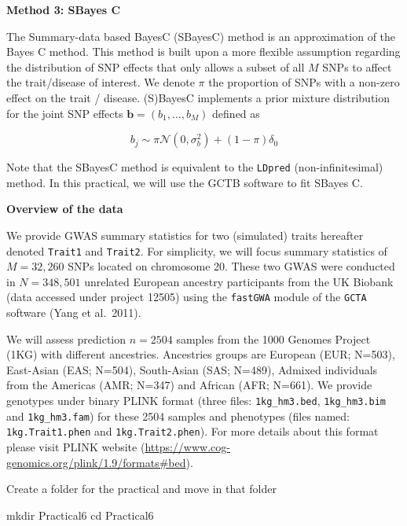 \documentclass[
  letterpaper,
  DIV=11,
  numbers=noendperiod]{scrartcl}
\newenvironment{Shaded}{\begin{snugshade}}{\end{snugshade}}
\newcommand{\BuiltInTok}[1]{\textcolor[rgb]{0.00,0.23,0.31}{#1}}
\newcommand{\FunctionTok}[1]{\textcolor[rgb]{0.28,0.35,0.67}{#1}}
\newcommand{\NormalTok}[1]{\textcolor[rgb]{0.00,0.23,0.31}{#1}}
\begin{document}
\textbf{Method 3: SBayes C}

The Summary-data based BayesC (SBayesC) method is an approximation of
the Bayes C method. This method is built upon a more flexible assumption
regarding the distribution of SNP effects that only allows a subset of
all \(M\) SNPs to affect the trait/disease of interest. We denote
\(\pi\) the proportion of SNPs with a non-zero effect on the trait /
disease. (S)BayesC implements a prior mixture distribution for the joint
SNP effects \(\mathbf{b} = \left(b_1,\ldots,b_M\right)\) defined as

\[ b_j \sim \pi \mathcal{N}\left(0,\sigma^2_b\right)  + (1-\pi) \delta_0\]

Note that the SBayesC method is equivalent to the \texttt{LDpred}
(non-infinitesimal) method. In this practical, we will use the GCTB
software to fit SBayes C.

\newpage

\textbf{Overview of the data}

We provide GWAS summary statistics for two (simulated) traits hereafter
denoted \texttt{Trait1} and \texttt{Trait2}. For simplicity, we will
focus summary statistics of \(M=32,260\) SNPs located on chromosome 20.
These two GWAS were conducted in \(N=348,501\) unrelated European
ancestry participants from the UK Biobank (data accessed under project
12505) using the \texttt{fastGWA} module of the \texttt{GCTA} software
(Yang et al.~2011).

We will assess prediction \(n=2504\) samples from the 1000 Genomes
Project (1KG) with different ancestries. Ancestries groups are European
(EUR; N=503), East-Asian (EAS; N=504), South-Asian (SAS; N=489), Admixed
individuals from the Americas (AMR; N=347) and African (AFR; N=661). We
provide genotypes under binary PLINK format (three files:
\texttt{1kg\_hm3.bed}, \texttt{1kg\_hm3.bim} and \texttt{1kg\_hm3.fam})
for these 2504 samples and phenotypes (files named:
\texttt{1kg.Trait1.phen} and \texttt{1kg.Trait2.phen}). For more details
about this format please visit PLINK website
(\url{https://www.cog-genomics.org/plink/1.9/formats\#bed}).

Create a folder for the practical and move in that folder

\begin{Shaded}
\begin{Highlighting}[]
\FunctionTok{mkdir}\NormalTok{ Practical6}
\BuiltInTok{cd}\NormalTok{ Practical6}
\end{Highlighting}
\end{Shaded}
\end{document}
